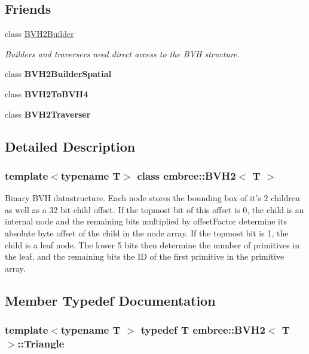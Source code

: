 \subsection*{Friends}
\begin{DoxyCompactItemize}
\item 
class \hyperlink{classembree_1_1_b_v_h2_a0be7246bdb347122c952d0184bdb54c1}{BVH2Builder}
\begin{DoxyCompactList}\small\item\em Builders and traversers need direct access to the BVH structure. \item\end{DoxyCompactList}\item 
\hypertarget{classembree_1_1_b_v_h2_aa56ace79309efc4bb7d4359236611d48}{
class {\bfseries BVH2BuilderSpatial}}
\label{classembree_1_1_b_v_h2_aa56ace79309efc4bb7d4359236611d48}

\item 
\hypertarget{classembree_1_1_b_v_h2_abcee8cef5aed865bf7be323048aee100}{
class {\bfseries BVH2ToBVH4}}
\label{classembree_1_1_b_v_h2_abcee8cef5aed865bf7be323048aee100}

\item 
\hypertarget{classembree_1_1_b_v_h2_a2a95bc6547d596add19ef40beeb17733}{
class {\bfseries BVH2Traverser}}
\label{classembree_1_1_b_v_h2_a2a95bc6547d596add19ef40beeb17733}

\end{DoxyCompactItemize}


\subsection{Detailed Description}
\subsubsection*{template$<$typename T$>$ class embree::BVH2$<$ T $>$}

Binary BVH datastructure. Each node stores the bounding box of it's 2 children as well as a 32 bit child offset. If the topmost bit of this offset is 0, the child is an internal node and the remaining bits multiplied by offsetFactor determine its absolute byte offset of the child in the node array. If the topmost bit is 1, the child is a leaf node. The lower 5 bits then determine the number of primitives in the leaf, and the remaining bits the ID of the first primitive in the primitive array. 

\subsection{Member Typedef Documentation}
\hypertarget{classembree_1_1_b_v_h2_af8815fd128a203409a0fe00c103c2710}{
\subsubsection[{Triangle}]{\setlength{\rightskip}{0pt plus 5cm}template$<$typename T $>$ typedef T {\bf embree::BVH2}$<$ T $>$::{\bf Triangle}}}
\label{classembree_1_1_b_v_h2_af8815fd128a203409a0fe00c103c2710}


